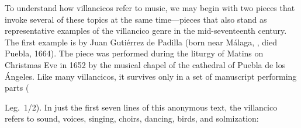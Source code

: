 To understand how villancicos refer to music, we may begin with two pieces that 
invoke several of these topics at the same time---pieces that also stand as 
representative examples of the villancico genre in the mid-seventeenth century.
The first example is  by Juan Gutiérrez 
de Padilla (born near Málaga, , died Puebla, 1664).
The piece was performed during the liturgy of Matins on Christmas Eve in 1652 
by the musical chapel of the cathedral of Puebla de los Ángeles.
Like many villancicos, it survives only in a set of manuscript performing parts 
(\signature{MEX-Pc}{Leg.~1/2}).
In just the first seven lines of this anonymous text, the villancico refers to 
sound, voices, singing, choirs, dancing, birds, and solmization:

